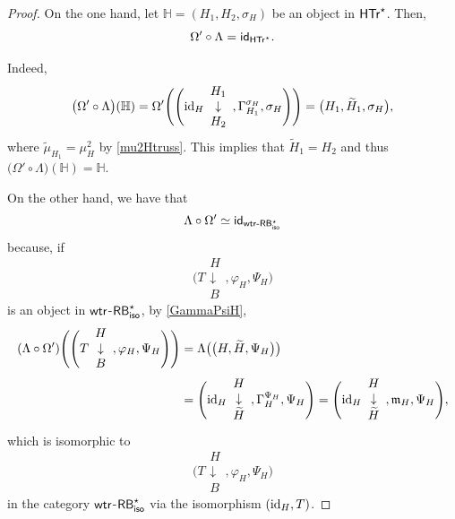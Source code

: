 \documentclass[10pt,a4paper]{amsart}
\numberwithin{equation}{section}
\begin{document}
\begin{proof}On the one hand, let $\mathbb{H}=(H_{1},H_{2},\sigma_{H})$ be an object in $\sf{HTr}^{\star}$. Then,
\[\Omega'\circ\Lambda={\sf id}_{\sf{HTr}^{\star}}.\]

Indeed,
\begin{align*}
\bigl(\Omega'\circ\Lambda\bigr)(\mathbb{H})=\Omega'\Biggl(\Biggl({\rm id}_{H}\begin{array}{c}H_{1}\\\downarrow\\H_{2}\end{array},\Gamma_{H_{1}}^{\sigma_{H}},\sigma_{H}\Biggr)\Biggr)=\bigl(H_{1},\widetilde{H}_{1},\sigma_{H}\bigr),
\end{align*}
where $\widetilde{\mu}_{H_{1}}=\mu_{H}^{2}$ by \eqref{mu2Htruss}. This implies that $\widetilde{H}_{1}=H_{2}$ and thus $\bigl(\Omega'\circ\Lambda\bigr)(\mathbb{H})=\mathbb{H}$.

On the other hand, we have that \[\Lambda\circ\Omega'\simeq{\sf id}_{{\sf wtr}\textnormal{-}{\sf RB}^{\star}_{{\sf iso}}}\]
because, if
\[
\Biggl(T\begin{array}{c}H\\\downarrow\\B\end{array},\varphi_{H},\Psi_{H}\Biggr)
\]
is an object in ${\sf wtr}$-${\sf RB}^{\star}_{{\sf iso}}$,
by \eqref{GammaPsiH},
\begin{align*}
(\Lambda\circ\Omega')\Biggl(\Biggl(T\begin{array}{c}H\\\downarrow\\B\end{array},\varphi_{H},\Psi_{H}\Biggr)\Biggr)
&{}=\Lambda\bigl(\bigl(H,\widetilde{H},\Psi_{H}\bigr)\bigr)\\
&{}=\Biggl({\rm id}_{H}\begin{array}{c}H\\\downarrow\\\widetilde{H}\end{array},\Gamma_{H}^{\Psi_{H}},\Psi_{H}\Biggr)
 =\Biggl({\rm id}_{H}\begin{array}{c}H\\\downarrow\\\widetilde{H}\end{array},\mathfrak{m}_{H},\Psi_{H}\Biggr),
\end{align*}
which is isomorphic to
\[
\Biggl(T\begin{array}{c}H\\\downarrow\\B\end{array},\varphi_{H},\Psi_{H}\Biggr)
\] in the category ${\sf wtr}$-${\sf RB}^{\star}_{{\sf iso}}$ via the isomorphism $({\rm id}_{H},T)$.
\end{proof}
\end{document}
